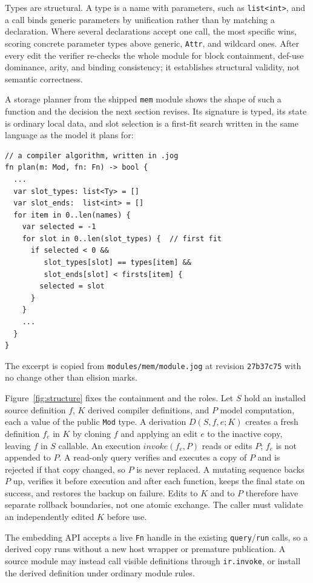 \documentclass[sigplan,anonymous,review]{acmart}
\begin{document}
Types are structural. A type is a name with parameters, such as
\texttt{list<int>}, and a call binds generic parameters by unification rather
than by matching a declaration. Where several declarations accept one call, the
most specific wins, scoring concrete parameter types above generic,
\texttt{Attr}, and wildcard ones. After every edit the verifier re-checks the
whole module for block containment, def-use dominance, arity, and binding
consistency; it establishes structural validity, not semantic correctness.

A storage planner from the shipped \texttt{mem} module shows the shape of such
a function and the decision the next section revises. Its signature is typed,
its state is ordinary local data, and slot selection is a first-fit search
written in the same language as the model it plans for:

\begin{verbatim}
// a compiler algorithm, written in .jog
fn plan(m: Mod, fn: Fn) -> bool {
  ...
  var slot_types: list<Ty> = []
  var slot_ends:  list<int> = []
  for item in 0..len(names) {
    var selected = -1
    for slot in 0..len(slot_types) {  // first fit
      if selected < 0 &&
         slot_types[slot] == types[item] &&
         slot_ends[slot] < firsts[item] {
        selected = slot
      }
    }
    ...
  }
}
\end{verbatim}

The excerpt is copied from \texttt{modules/mem/module.jog} at revision
\texttt{27b37c75} with no change other than elision marks.

Figure~\ref{fig:structure} fixes the containment and the roles. Let $S$ hold an
installed source definition $f$, $K$ derived compiler definitions, and $P$ model
computation, each a value of the public \texttt{Mod} type. A derivation $D(S,f,e;K)$ creates a fresh definition $f_e$ in $K$ by
cloning $f$ and applying an edit $e$ to the inactive copy, leaving $f$ in $S$
callable. An execution $\mathit{invoke}(f_e,P)$ reads or edits $P$; $f_e$ is
not appended to $P$. A read-only query verifies and executes a copy of $P$ and
is rejected if that copy changed, so $P$ is never replaced. A mutating sequence
backs $P$ up, verifies it before execution and after each function, keeps the
final state on success, and restores the backup on failure. Edits to $K$ and to
$P$ therefore have separate rollback boundaries, not one atomic exchange. The caller must validate an
independently edited $K$ before use.

The embedding API accepts a live \texttt{Fn} handle in the existing
\texttt{query}/\texttt{run} calls, so a derived copy runs without a new host
wrapper or premature publication. A source module may instead call visible
definitions through \texttt{ir.invoke}, or install the derived definition
under ordinary module rules.
\end{document}
